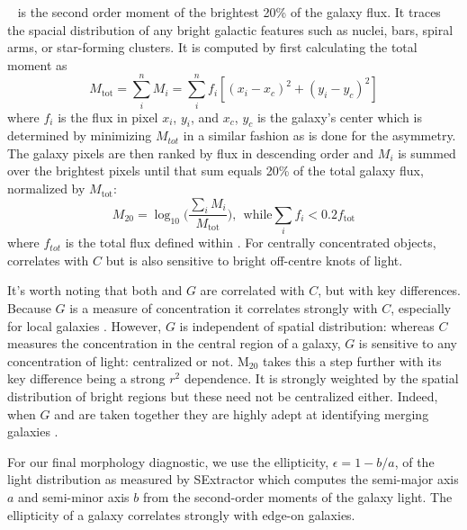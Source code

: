 ~\citep{Lotz2004} is the second order moment of the brightest 20\% of the galaxy flux. It traces the spacial distribution of any bright galactic features such as nuclei, bars, spiral arms, or star-forming clusters. It is computed by first calculating the total moment as
\begin{equation}
 M_{\mathrm{tot}} = \sum_i^n M_i = \sum_i^nf_i[(x_i-x_c)^2 + (y_i-y_c)^2] 
\end{equation}
where $f_i$ is the flux in pixel $x_i$, $y_i$, and $x_c$, $y_c$ is the galaxy's center which is determined by minimizing $M_{tot}$ in a similar fashion as is done for the asymmetry. The galaxy pixels are then ranked by flux in descending order and $M_i$ is summed over the brightest pixels until that sum equals 20\% of the total galaxy flux, normalized by $M_{\mathrm{tot}}$:
\begin{equation}
 M_{20} = \log_{10} \Big( \frac{\sum_iM_i}{M_{\mathrm{tot}}} \Big), ~~\textrm{while} \sum_if_i < 0.2f_{\mathrm{tot}}
\end{equation}
where $f_{tot}$ is the total flux defined within \rp. For centrally concentrated objects,  correlates with $C$ but is also sensitive to bright off-centre knots of light. 

It's worth noting that both  and $G$ are correlated with $C$, but with key differences. Because $G$ is a measure of concentration it correlates strongly with $C$, especially for local galaxies \cite{Abraham2003}. However, $G$ is independent of spatial distribution: whereas $C$ measures the concentration in the central region of a galaxy, $G$ is sensitive to any concentration of light: centralized or not. M$_{20}$ takes this a step further with its key difference being a strong $r^2$ dependence. It is strongly weighted by the spatial distribution of bright regions but these need not be centralized either.  Indeed, when $G$ and  are taken together they are highly adept at identifying merging galaxies \citep{Lotz2004,Lotz2008}.  


For our final morphology diagnostic, we use the ellipticity, $\epsilon = 1 - b/a$, of the light distribution as measured by SExtractor which computes the semi-major axis $a$ and semi-minor axis $b$ from the second-order moments of the galaxy light. The ellipticity of a galaxy correlates strongly with edge-on galaxies. 

